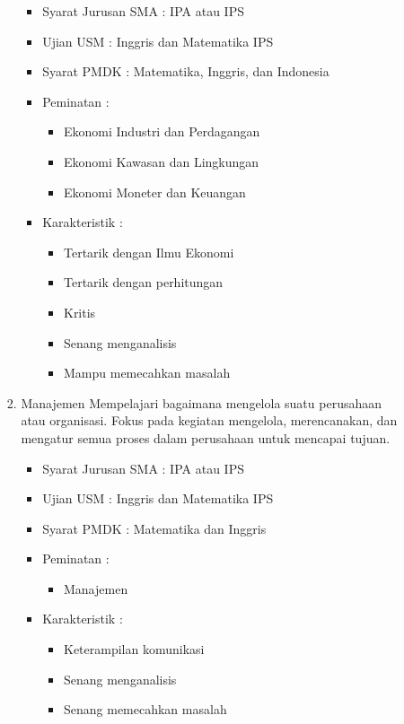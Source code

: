\documentclass[a4paper,twoside]{article}
\begin{document}
\begin{enumerate}
\begin{enumerate}
\begin{enumerate}
					\begin{itemize}
						\item Syarat Jurusan SMA : IPA atau IPS
						\item Ujian USM : Inggris dan Matematika IPS
						\item Syarat PMDK : Matematika, Inggris, dan Indonesia
						\item Peminatan :
						\begin{itemize}
							\item Ekonomi Industri dan Perdagangan
							\item Ekonomi Kawasan dan Lingkungan
							\item Ekonomi Moneter dan Keuangan
						\end{itemize}
						\item Karakteristik :
						\begin{itemize}
							\item Tertarik dengan Ilmu Ekonomi
							\item Tertarik dengan perhitungan 
							\item Kritis
							\item Senang menganalisis
							\item Mampu memecahkan masalah
						\end{itemize}
					\end{itemize}
					
				\item Manajemen
					Mempelajari bagaimana mengelola suatu perusahaan atau organisasi. Fokus pada kegiatan mengelola, merencanakan, dan mengatur semua proses dalam perusahaan untuk mencapai tujuan.
					\begin{itemize}
						\item Syarat Jurusan SMA : IPA atau IPS
						\item Ujian USM : Inggris dan Matematika IPS
						\item Syarat PMDK : Matematika dan Inggris
						\item Peminatan :
						\begin{itemize}
							\item Manajemen 
						\end{itemize}
						\item Karakteristik :
						\begin{itemize}
							\item Keterampilan komunikasi
							\item Senang menganalisis
							\item Senang memecahkan masalah
						\end{itemize}
					\end{itemize}									
				

\end{enumerate}
\end{enumerate}
\end{enumerate}
\end{document}
